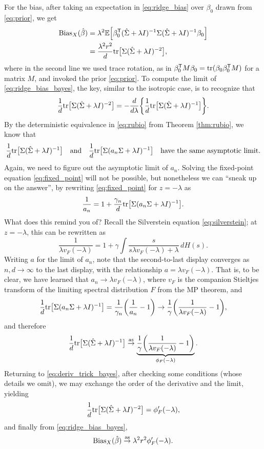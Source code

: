 \documentclass{article}
\begin{document}
For the bias, after taking an expectation in \eqref{eq:ridge_bias} over
$\beta_0$ drawn from \eqref{eq:prior}, we get
\begin{align}
\nonumber
\mathrm{Bias}_X(\hat{\beta}) 
&= \lambda^2 \mathbb{E} \Big[ \beta_0^{\mathsf{T}} (\hat\Sigma + \lambda I)^{-1} \Sigma (\hat\Sigma + 
  \lambda I)^{-1} \beta_0 \Big] \\
\label{eq:ridge_bias_bayes}
&= \frac{\lambda^2 r^2}{d} \mathrm{tr} \big[ \Sigma (\hat\Sigma + \lambda I)^{-2} \big],
\end{align}
where in the second line we used trace rotation, as in $\beta_0^{\mathsf{T}} M \beta_0 = 
\mathrm{tr}(\beta_0 \beta_0^{\mathsf{T}} M)$ for a matrix $M$, and invoked the prior
\eqref{eq:prior}. To compute the limit of \eqref{eq:ridge_bias_bayes}, the key,
similar to the isotropic case, is to recognize that   
\begin{equation}
\label{eq:deriv_trick_bayes}
\frac{1}{d} \mathrm{tr} \big[ \Sigma (\hat\Sigma + \lambda I)^{-2} \big] = -
\frac{d}{d\lambda} \bigg \{ \frac{1}{d} \mathrm{tr} \big[ \Sigma (\hat\Sigma + \lambda  
I)^{-1} \big] \bigg\}.   
\end{equation}
By the deterministic equivalence in \eqref{eq:rubio} from Theorem
\ref{thm:rubio}, we know that
\[
\frac{1}{d} \mathrm{tr} \big[ \Sigma (\hat\Sigma + \lambda I)^{-1} \big] \quad \text{and}
\quad \frac{1}{d} \mathrm{tr} \big[\Sigma (a_n \Sigma + \lambda I)^{-1} \big] \quad
\text{have the same asymptotic limit}.
\]
Again, we need to figure out the asymptotic limit of $a_n$. Solving the
fixed-point equation \eqref{eq:fixed_point} will not be possible, but
nonetheless we can ``sneak up on the answer'', by rewriting
\eqref{eq:fixed_point} for $z = -\lambda$ as
\[
\frac{1}{a_n}  = 1 + \frac{\gamma_n}{d} \mathrm{tr} \big[ \Sigma (a_n \Sigma + \lambda 
I)^{-1} \big]. 
\]
What does this remind you of? Recall the Silverstein equation
\eqref{eq:silverstein}; at $z = -\lambda$, this can be rewritten as     
\[
\frac{1}{\lambda v_F(-\lambda)} = 1 + \gamma \int \frac{s}{s \lambda
  v_F(-\lambda) + \lambda} \, dH(s). 
\]
Writing $a$ for the limit of $a_n$, note that the second-to-last display
converges as $n,d \to \infty$ to the last display, with the relationship $a =
\lambda v_F(-\lambda)$. That is, to be clear, we have learned that $a_n \to
\lambda v_F(-\lambda)$, where $v_F$ is the companion Stieltjes transform of the
limiting spectral distribution $F$ from the MP theorem, and 
\[
\frac{1}{d} \mathrm{tr} \big[ \Sigma (a_n \Sigma + \lambda I)^{-1} \big] =
\frac{1}{\gamma_n} \bigg( \frac{1}{a_n} - 1 \bigg) \to \frac{1}{\gamma} 
\bigg( \frac{1}{\lambda v_F(-\lambda)} - 1 \bigg),
\]
and therefore 
\[
\frac{1}{d} \mathrm{tr} \big[ \Sigma (\hat\Sigma + \lambda I)^{-1} \big] \overset{\mathrm{as}}{\to}
\underbrace{\frac{1}{\gamma} \bigg( \frac{1}{\lambda v_F(-\lambda)} - 1   
  \bigg)}_{\phi_F(-\lambda)}. 
\]
Returning to \eqref{eq:deriv_trick_bayes}, after checking some conditions (whose 
details we omit), we may exchange the order of the derivative and the limit,
yielding  
\[
\frac{1}{d} \mathrm{tr} \big[ \Sigma (\hat\Sigma + \lambda I)^{-2} \big] =
\phi'_F(-\lambda),
\]
and finally from \eqref{eq:ridge_bias_bayes}, 
\begin{equation}
\label{eq:ridge_bias_bayes_limit}
\mathrm{Bias}_X(\hat{\beta}) \overset{\mathrm{as}}{\to} \lambda^2 r^2 \phi'_F(-\lambda). 
\end{equation}
\end{document}
